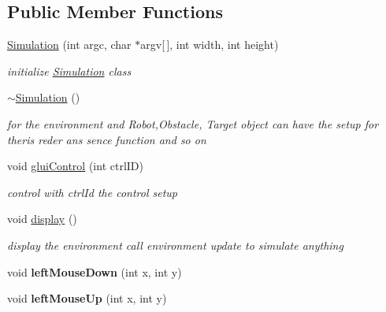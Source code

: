 \subsection*{Public Member Functions}
\begin{DoxyCompactItemize}
\item 
\hyperlink{classSimulation_a4c669ceaa34c7130966ce45f9de75fbe}{Simulation} (int argc, char $\ast$argv\mbox{[}$\,$\mbox{]}, int width, int height)
\begin{DoxyCompactList}\small\item\em initialize \hyperlink{classSimulation}{Simulation} class \end{DoxyCompactList}\item 
\hyperlink{classSimulation_a80fad3f57dfaf195a36f7bc49bc88279}{$\sim$\-Simulation} ()
\begin{DoxyCompactList}\small\item\em for the environment and Robot,Obstacle, Target object can have the setup for theris reder ans sence function and so on \end{DoxyCompactList}\item 
\hypertarget{classSimulation_ad50fa94a630141b3221d2d946a4bb11b}{void \hyperlink{classSimulation_ad50fa94a630141b3221d2d946a4bb11b}{glui\-Control} (int ctrl\-I\-D)}\label{classSimulation_ad50fa94a630141b3221d2d946a4bb11b}

\begin{DoxyCompactList}\small\item\em control with ctrl\-Id the control setup \end{DoxyCompactList}\item 
\hypertarget{classSimulation_a449dcb7d97dfba99efe770de2f399c31}{void \hyperlink{classSimulation_a449dcb7d97dfba99efe770de2f399c31}{display} ()}\label{classSimulation_a449dcb7d97dfba99efe770de2f399c31}

\begin{DoxyCompactList}\small\item\em display the environment call environment update to simulate anything \end{DoxyCompactList}\item 
\hypertarget{classSimulation_a786d1ba31d29937f0ac6f3ea88f8a607}{void {\bfseries left\-Mouse\-Down} (int x, int y)}\label{classSimulation_a786d1ba31d29937f0ac6f3ea88f8a607}

\item 
\hypertarget{classSimulation_a62ef254d85017074cd521a5787b5a234}{void {\bfseries left\-Mouse\-Up} (int x, int y)}\label{classSimulation_a62ef254d85017074cd521a5787b5a234}

\end{DoxyCompactItemize}
